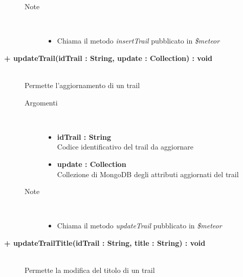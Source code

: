 \begin{description}
\begin{description}
\begin{description}
\begin{itemize}
				\end{itemize}
			\item[Note] \hfill \\
			\begin{itemize}
					\item Chiama il metodo \textit{insertTrail} pubblicato in \textit{\$meteor}
			\end{itemize}
		\end{description}
	\end{description}
	
	\begin{description}
		\item[\textbf{\color{blue}+ updateTrail(idTrail : String, update : Collection) : void			}] \hfill \\
			Permette l'aggiornamento di un trail
			
		\begin{description}
			\item[Argomenti] \hfill \\
				\begin{itemize}
					\item \textbf{idTrail : String			} \hfill \\
					Codice identificativo del trail da aggiornare
					\item \textbf{update :  Collection			} \hfill \\
					Collezione di MongoDB degli attributi aggiornati del trail
					
				\end{itemize}
			\item[Note] \hfill \\
			\begin{itemize}
					\item Chiama il metodo \textit{updateTrail} pubblicato in \textit{\$meteor}
			\end{itemize}
		\end{description}
	\end{description}
	
	\begin{description}
		\item[\textbf{\color{blue}+ updateTrailTitle(idTrail : String, title : String) : void			}] \hfill \\
			Permette la modifica del titolo di un trail
			

\end{description}
\end{description}
